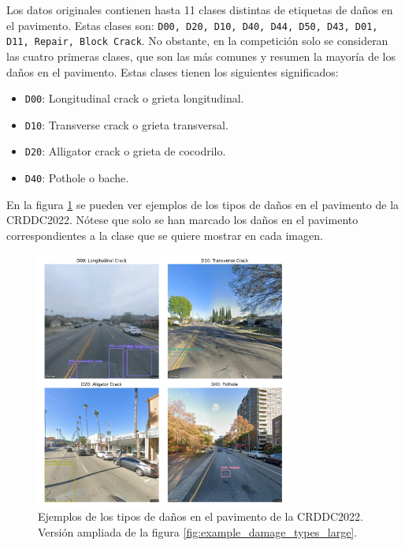 Los datos originales contienen hasta 11 clases distintas de etiquetas de daños en el pavimento. Estas clases son: \texttt{D00, D20, D10, D40, D44, D50, D43, D01, D11, Repair, Block Crack}. No obstante, en la competición solo se consideran las cuatro primeras clases, que son las más comunes y resumen la mayoría de los daños en el pavimento. Estas clases tienen los siguientes significados:

\begin{itemize}
    \item \texttt{D00}: Longitudinal crack o grieta longitudinal.
    \item \texttt{D10}: Transverse crack o grieta transversal.
    \item \texttt{D20}: Alligator crack o grieta de cocodrilo.
    \item \texttt{D40}: Pothole o bache.
\end{itemize}

En la figura \ref{fig:example_damage_types} se pueden ver ejemplos de los tipos de daños en el pavimento de la CRDDC2022. Nótese que solo se han marcado los daños en el pavimento correspondientes a la clase que se quiere mostrar en cada imagen.

\begin{figure}[H]
    \centering
    \includegraphics[width=0.75\textwidth]{img/example_damage_types_grid.png}
    \caption{Ejemplos de los tipos de daños en el pavimento de la CRDDC2022. Versión ampliada de la figura \ref{fig:example_damage_types_large}.}
    \label{fig:example_damage_types}
\end{figure}


